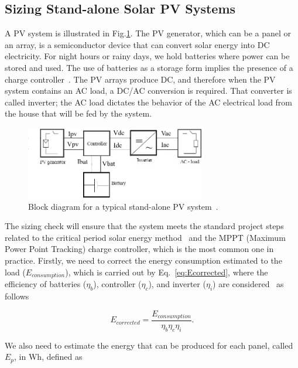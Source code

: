 \documentclass[runningheads]{llncs}
\begin{document}
\subsection{Sizing Stand-alone Solar PV Systems}
\label{sec:sizing}

A PV system is illustrated in Fig.\ref{fig:blockdiagram}. 
The PV generator, which can be a panel or an array, is a semiconductor device that can convert solar energy into DC electricity. 
For night hours or rainy days, we hold batteries where power can be stored and used. The use of batteries as a storage form implies the presence of a charge controller~\cite{Hansen}. The PV arrays produce DC, and therefore when the PV system contains an AC load, a DC/AC conversion is required. That converter is called inverter; the AC load dictates the behavior of the AC electrical load from the house that will be fed by the system.

\begin{figure}[h]
\includegraphics[width=0.7\textwidth]{blockdiagramPVS2_rev}
\centering
\caption{Block diagram for a typical stand-alone PV system~\cite{Hansen}.}
\label{fig:blockdiagram} 
\end{figure}

The sizing check will ensure that the system meets the standard project steps related to the critical period solar energy method~\cite{Pinho} and the MPPT (Maximum Power Point Tracking) charge controller, which is the most common one in practice. Firstly, we need to correct the energy consumption estimated to the load ($E_{consumption}$), which is carried out by Eq.~\ref{eq:Ecorrected}, where the efficiency of batteries ($\eta_{b}$), controller ($\eta_{c}$), and inverter ($\eta_{i}$) are considered~\cite{Pinho} as follows

\begin{equation}
\label{eq:Ecorrected}
E_{corrected} = \frac {E_{consumption}}{\eta_{b} \eta_{c} \eta_{i} }.
\end{equation}

We also need to estimate the energy that can be produced for each panel, called $E_{p}$, in Wh, defined as
\end{document}

